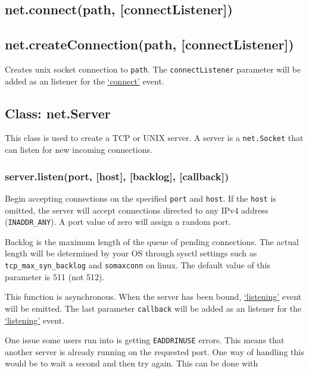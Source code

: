 \subsection{net.connect(path, {[}connectListener{]})}

\subsection{net.createConnection(path, {[}connectListener{]})}

Creates unix socket connection to \texttt{path}. The
\texttt{connectListener} parameter will be added as an listener for the
\hyperref[net\_event\_connect]{`connect'} event.

\subsection{Class: net.Server}

This class is used to create a TCP or UNIX server. A server is a
\texttt{net.Socket} that can listen for new incoming connections.

\subsubsection{server.listen(port, {[}host{]}, {[}backlog{]},
{[}callback{]})}

Begin accepting connections on the specified \texttt{port} and
\texttt{host}. If the \texttt{host} is omitted, the server will accept
connections directed to any IPv4 address (\texttt{INADDR\_ANY}). A port
value of zero will assign a random port.

Backlog is the maximum length of the queue of pending connections. The
actual length will be determined by your OS through sysctl settings such
as \texttt{tcp\_max\_syn\_backlog} and \texttt{somaxconn} on linux. The
default value of this parameter is 511 (not 512).

This function is asynchronous. When the server has been bound,
\hyperref[net\_event\_listening]{`listening'} event will be emitted. The
last parameter \texttt{callback} will be added as an listener for the
\hyperref[net\_event\_listening]{`listening'} event.

One issue some users run into is getting \texttt{EADDRINUSE} errors.
This means that another server is already running on the requested port.
One way of handling this would be to wait a second and then try again.
This can be done with

